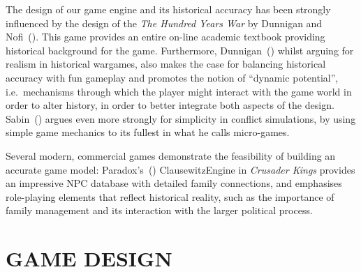 \documentclass[11pt]{article}
\begin{document}
The design of our game engine and its historical accuracy has been
strongly influenced by the design of the \textit{The Hundred Years War}
by Dunnigan and Nofi~(\cite*{hyw}). This game  provides an entire on-line academic textbook providing
historical background for the game. Furthermore,
Dunnigan~(\cite*{Dunnigan}) whilst arguing for realism in historical wargames, 
also makes the case for balancing historical accuracy with fun gameplay
and promotes the notion of ``dynamic potential'',  i.e.\ mechanisms
through which the player might interact with the game world in order
to alter history, in order to better integrate both aspects of the
design. 
Sabin~(\cite*{Sabin}) argues even more strongly for simplicity in conflict simulations,
by using simple game mechanics to its fullest  in what he calls micro-games.


Several modern, commercial games demonstrate the feasibility of building an accurate game model:
Paradox's~(\cite*{ck2}) ClausewitzEngine in \textit{Crusader Kings\/} provides
an impressive NPC database with detailed family connections, and
emphasises  role-playing elements that reflect historical reality,
such as the importance of family management and its interaction with the
larger political process.


\section*{GAME DESIGN}

\end{document}
